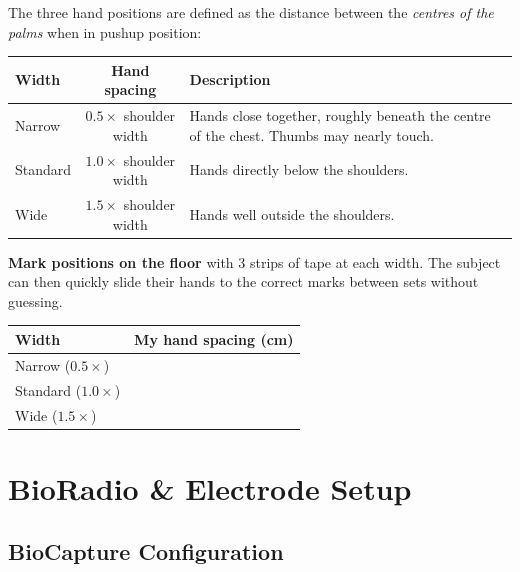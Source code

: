 \documentclass[11pt,letterpaper]{article}
\begin{document}
The three hand positions are defined as the distance between the \emph{centres of the palms} when in pushup position:

\begin{center}
\renewcommand{\arraystretch}{1.3}
\begin{tabular}{@{} l c p{6cm} @{}}
\toprule
\textbf{Width} & \textbf{Hand spacing} & \textbf{Description} \\
\midrule
Narrow   & $0.5 \times$ shoulder width & Hands close together, roughly beneath the centre of the chest.  Thumbs may nearly touch. \\
Standard & $1.0 \times$ shoulder width & Hands directly below the shoulders. \\
Wide     & $1.5 \times$ shoulder width & Hands well outside the shoulders. \\
\bottomrule
\end{tabular}
\end{center}

\textbf{Mark positions on the floor} with 3 strips of tape at each width.  The subject can then quickly slide their hands to the correct marks between sets without guessing.

\begin{center}
\renewcommand{\arraystretch}{1.3}
\begin{tabular}{@{} l c @{}}
\toprule
\textbf{Width} & \textbf{My hand spacing (cm)} \\
\midrule
Narrow ($0.5\times$)   & \underline{\hspace{3cm}} \\
Standard ($1.0\times$) & \underline{\hspace{3cm}} \\
Wide ($1.5\times$)     & \underline{\hspace{3cm}} \\
\bottomrule
\end{tabular}
\end{center}

\section{BioRadio \& Electrode Setup}

\subsection{BioCapture Configuration}
\end{document}
